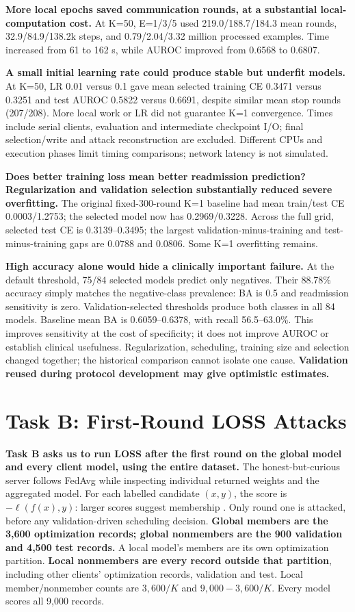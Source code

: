 \documentclass[10pt]{article}
\begin{document}
\textbf{More local epochs saved communication rounds, at a substantial local-computation cost.} At K=50, E=1/3/5 used 219.0/188.7/184.3 mean rounds, 32.9/84.9/138.2k steps, and 0.79/2.04/3.32 million processed examples. Time increased from 61 to 162 s, while AUROC improved from 0.6568 to 0.6807.

\textbf{A small initial learning rate could produce stable but underfit models.} At K=50, LR 0.01 versus 0.1 gave mean selected training CE 0.3471 versus 0.3251 and test AUROC 0.5822 versus 0.6691, despite similar mean stop rounds (207/208). More local work or LR did not guarantee K=1 convergence.
Times include serial clients, evaluation and intermediate checkpoint I/O;
final selection/write and attack reconstruction are excluded. Different CPUs
and execution phases limit timing comparisons; network latency is not simulated.

\textbf{Does better training loss mean better readmission prediction?} \textbf{Regularization and validation selection substantially reduced severe overfitting.} The original fixed-300-round K=1 baseline had mean train/test CE 0.0003/1.2753; the selected model now has 0.2969/0.3228. Across the full grid, selected test CE is 0.3139--0.3495; the largest validation-minus-training and test-minus-training gaps are 0.0788 and 0.0806. Some K=1 overfitting remains.

\textbf{High accuracy alone would hide a clinically important failure.} At the default threshold, 75/84 selected models predict only negatives. Their 88.78\% accuracy simply matches the negative-class prevalence: BA is 0.5 and readmission sensitivity is zero. Validation-selected thresholds produce both classes in all 84 models. Baseline mean BA is 0.6059--0.6378, with recall 56.5--63.0\%. This improves sensitivity at the cost of specificity; it does not improve AUROC or establish clinical usefulness.
Regularization, scheduling, training size and selection changed together; the
historical comparison cannot isolate one cause. \textbf{Validation reused during
protocol development may give optimistic estimates.}

\section{Task B: First-Round LOSS Attacks}
\textbf{Task B asks us to run LOSS after the first round on the global model and
every client model, using the entire dataset.}
The honest-but-curious server follows FedAvg while inspecting individual
returned weights and the aggregated model. For each labelled candidate $(x,y)$,
the score is $-\ell(f(x),y)$: larger scores suggest membership \cite{loss}.
Only round one is attacked, before any validation-driven scheduling decision.
\textbf{Global members are the 3,600 optimization records; global nonmembers are
the 900 validation and 4,500 test records.} A local model's members are its own
optimization partition. \textbf{Local nonmembers are every record outside that
partition}, including other clients' optimization records, validation and test.
Local member/nonmember counts are $3,600/K$ and $9,000-3,600/K$.
Every model scores all 9,000 records.
\end{document}
